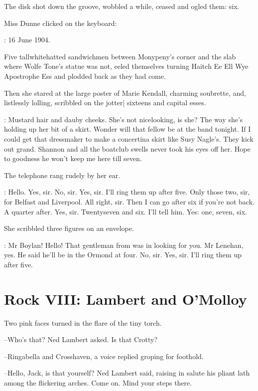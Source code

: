 The disk shot down the groove,
wobbled a while,
ceased and ogled them: six.

Miss Dunne clicked on the keyboard:

\missdunne:
16 June 1904.

Five tallwhitehatted sandwichmen
between Monypeny's corner and the slab where Wolfe Tone's statue was not,
eeled themselves turning
Haitch Ee Ell Wye Apostrophe Ess \stage{[H.E.L.Y.'S]}
and plodded back as they had come.

Then she stared at the large poster of Marie Kendall,
charming soubrette,
and,
listlessly lolling,
scribbled on the jotter|
sixteens and capital esses.

\dunneint:
Mustard hair and dauby cheeks.
She's not nicelooking, is she?
The way she's holding up her bit of a skirt.
Wonder will that fellow be at the band tonight.
If I could get that dressmaker to make a concertina skirt like Susy Nagle's.
They kick out grand.
Shannon and all the boatclub swells never took his eyes off her.
Hope to goodness he won't keep me here till seven.

The telephone rang rudely by her ear.

\missdunne:
Hello.
Yes, sir.
No, sir.
Yes, sir.
I'll ring them up after five.
Only those two, sir, for Belfast and Liverpool.
All right, sir.
Then I can go after six if you're not back.
A quarter after.
Yes, sir.
Twentyseven and six.
I'll tell him.
Yes: one, seven, six.

She scribbled three figures on an envelope.

\missdunne:
Mr Boylan!
Hello!
That gentleman from  was in looking for you.
Mr Lenehan, yes.
He said he'll be in the Ormond at four.
No, sir.
Yes, sir.
I'll ring them up after five.


\section*{Rock VIII: Lambert and O'Molloy}


Two pink faces turned in the flare of the tiny torch.

--Who's that? Ned Lambert asked.
Is that Crotty?

--Ringabella and Crosshaven,
a voice replied groping for foothold.

--Hello, Jack, is that yourself?
Ned Lambert said,
raising in salute his pliant lath
among the flickering arches.
Come on.
Mind your steps there.

